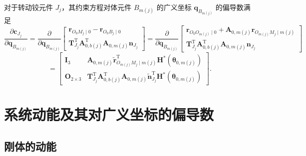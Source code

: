 对于转动铰元件 $J_j$，其约束方程对体元件 $B_{m(j)}$ 的广义坐标 $\boldsymbol{q}_{B_{m(j)}}$ 的偏导数满足
\begin{equation}\label{eq:9.11}
  \frac{\partial \boldsymbol{c}_{J_j}}{\partial \boldsymbol{q}_{B_{m(j)}}}
  = \frac{\partial}{\partial \boldsymbol{q}_{B_{m(j)}}}
  \begin{bmatrix}
    \boldsymbol{r}_{O_0 M_j \mid 0} - \boldsymbol{r}_{O_0 B_j \mid 0} \\[4pt]
    \boldsymbol{T}_{J_j}^{\mathrm{T}} \boldsymbol{A}_{0,b(j)}^{\mathrm{T}} \boldsymbol{A}_{0,m(j)} \boldsymbol{n}_{J_j}
  \end{bmatrix}
  = \frac{\partial}{\partial \boldsymbol{q}_{B_{m(j)}}}
  \begin{bmatrix}
    \boldsymbol{r}_{O_0 O_{m(j)} \mid 0} + \boldsymbol{A}_{0,m(j)} \boldsymbol{r}_{O_{m(j)} M_j \mid m(j)} \\[4pt]
    \boldsymbol{T}_{J_j}^{\mathrm{T}} \boldsymbol{A}_{0,b(j)}^{\mathrm{T}} \boldsymbol{A}_{0,m(j)} \boldsymbol{n}_{J_j}
  \end{bmatrix}
\end{equation}
\begin{equation}\label{eq:9.12}
  = \begin{bmatrix}
    \boldsymbol{I}_3 & \boldsymbol{A}_{0,m(j)} \tilde{\boldsymbol{r}}_{O_{m(j)} M_j \mid m(j)}^{\mathrm{T}} \boldsymbol{H}^*(\boldsymbol{\theta}_{0,m(j)}) \\[4pt]
    \boldsymbol{O}_{2\times 3} & \boldsymbol{T}_{J_j}^{\mathrm{T}} \boldsymbol{A}_{0,b(j)}^{\mathrm{T}} \boldsymbol{A}_{0,m(j)} \tilde{\boldsymbol{n}}_{J_j}^{\mathrm{T}} \boldsymbol{H}^*(\boldsymbol{\theta}_{0,m(j)})
  \end{bmatrix}.
\end{equation}

\section{系统动能及其对广义坐标的偏导数}

\subsection{刚体的动能}

